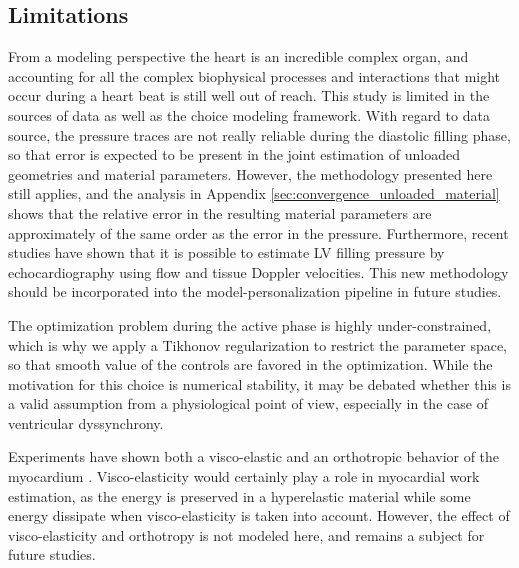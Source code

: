 


\subsection{Limitations}

From a modeling perspective the heart is an incredible complex organ,
and accounting for all the complex biophysical processes and
interactions that might occur during a heart beat is still well out of
reach. This study is limited in the sources of data as well as the
choice modeling framework. With regard to data source, the
pressure traces are not really reliable during the diastolic filling
phase, so that error is expected to be present in the joint estimation
of unloaded geometries and material parameters. However, the
methodology presented here still applies, and the analysis in Appendix
\ref{sec:convergence_unloaded_material} shows that the relative error
in the  resulting material parameters are approximately of the same
order as the error in the pressure. Furthermore, recent studies have
shown that it is
possible to estimate LV filling pressure by echocardiography
\cite{andersen2017estimating} using flow and tissue Doppler
velocities. This new methodology should be incorporated into the
model-personalization pipeline in future studies.

The optimization problem during the active phase is highly
under-constrained, which is why we apply a Tikhonov regularization to
restrict the parameter space, so that smooth value of the controls are
favored in the optimization. While the motivation for this choice is
numerical stability, it may be debated whether this is a valid
assumption from a physiological point of view, especially in the case
of ventricular dyssynchrony.  

Experiments have shown both a visco-elastic and an orthotropic
behavior of the myocardium
\cite{dokos2002shear,sommer2015biomechanical}.
Visco-elasticity would certainly play a role in myocardial work estimation,
as the energy is preserved in a hyperelastic material while some energy dissipate when
visco-elasticity is taken into account. However, the effect of
visco-elasticity and orthotropy is not modeled here, and remains a
subject for future studies. 

